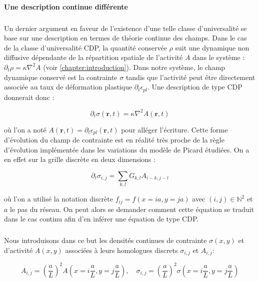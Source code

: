 \paragraph{Une description continue différente}

\subparagraph{}Un dernier argument en faveur de l'existence d'une telle classe d'universalité se base sur une description en termes de théorie continue des champs. Dans le cas de la classe d'universalité CDP, la quantité conservée $\rho$ suit une dynamique non diffusive dépendante de la répartition spatiale de l'activité $A$ dans le système : $\partial_t \rho = \kappa\nabla^2 A$ (voir \autoref{chapter:introduction}). Dans notre système, le champ dynamique conservé est la contrainte $\sigma$ tandis que l'activité peut être directement associée au taux de déformation plastique $\partial_t \epsilon_{pl}$. Une description de type CDP donnerait donc :

\begin{equation}
	\partial_t \sigma(\mathbf{r},t) = \kappa\nabla^2 A(\mathbf{r},t)
\end{equation}

\noindent où l'on a noté $A(\mathbf{r},t) = \partial_t \epsilon_{pl}(\mathbf{r},t)$ pour alléger l'écriture. Cette forme d'évolution du champ de contrainte est en réalité très proche de la règle d'évolution implémentée dans les variations du modèle de Picard étudiées. On a en effet sur la grille discrète en deux dimensions :


\begin{equation}
    \partial_t\sigma_{i,j} = \sum_{k,l}G_{k,l}A_{i-k, j-l}
    \label{eq:1}
\end{equation}

\noindent où l'on a utilisé la notation discrète $f_ {ij}=f(x=ia, y=ja)$ avec $(i,j) \in \mathbb{N}^2$ et $a$ le pas du réseau. On peut alors se demander comment cette équation se traduit dans le cas continu afin d'en inférer une équation de type CDP.

\subparagraph{}Nous introduisons dans ce but les densités continues de contrainte $\sigma (x,y)$ et d'activité $A (x,y)$ associées à leurs homologues discrets  $\sigma_{i, j}$ et $A_{i, j}$:

\begin{equation}
    A_{i, j} = \left( \frac{a}{L} \right)^2A(x=i\frac{a}{L},y=j\frac{a}{L}),\quad
    \sigma_{i, j} = \left( \frac{a}{L} \right)^2\sigma(x=i\frac{a}{L},y=j\frac{a}{L})
\end{equation}

